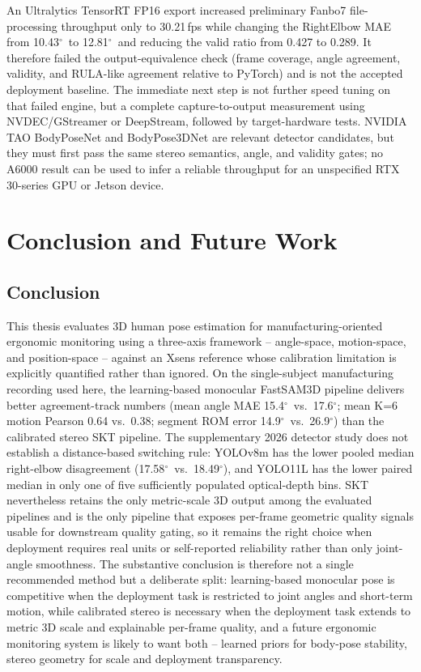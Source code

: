 \documentclass[12pt,a4paper]{article}
\newcommand{\degr}{\ensuremath{^\circ}}
\begin{document}
An Ultralytics TensorRT FP16 export increased preliminary Fanbo7 file-processing throughput only
to 30.21\,fps while changing the RightElbow MAE from 10.43\degr\ to
12.81\degr\ and reducing the valid ratio from 0.427 to 0.289.  It therefore
failed the output-equivalence check (frame coverage, angle agreement,
validity, and RULA-like agreement relative to PyTorch) and is not the accepted deployment
baseline.  The immediate next step is not further speed tuning on that
failed engine, but a complete capture-to-output measurement using
NVDEC/GStreamer or DeepStream, followed by target-hardware tests.  NVIDIA
TAO BodyPoseNet and BodyPose3DNet are relevant detector candidates, but they
must first pass the same stereo semantics, angle, and validity gates; no
A6000 result can be used to infer a reliable throughput for an unspecified
RTX 30-series GPU or Jetson device.

\clearpage
\section{Conclusion and Future Work}
\label{sec:conclusion}

\subsection{Conclusion}

This thesis evaluates 3D human pose estimation for manufacturing-oriented
ergonomic monitoring using a three-axis framework -- angle-space,
motion-space, and position-space -- against an Xsens reference whose
calibration limitation is explicitly quantified rather than ignored.
On the single-subject manufacturing recording used here, the
learning-based monocular FastSAM3D pipeline delivers better
agreement-track numbers (mean angle MAE 15.4\degr\ vs.\ 17.6\degr; mean
K=6 motion Pearson 0.64 vs.\ 0.38; segment ROM error 14.9\degr\ vs.\
26.9\degr) than the calibrated stereo SKT pipeline.
The supplementary 2026 detector study does not establish a distance-based
switching rule: YOLOv8m has the lower pooled median right-elbow disagreement
(17.58\degr\ vs.\ 18.49\degr), and YOLO11L has the lower paired median in
only one of five sufficiently populated optical-depth bins.
SKT nevertheless retains the only metric-scale 3D output among the
evaluated pipelines and is the only pipeline that exposes per-frame
geometric quality signals usable for downstream quality gating, so it
remains the right choice when deployment requires real units or
self-reported reliability rather than only joint-angle smoothness.
The substantive conclusion is therefore not a single recommended method
but a deliberate split: learning-based monocular pose is competitive
when the deployment task is restricted to joint angles and short-term
motion, while calibrated stereo is necessary when the deployment task
extends to metric 3D scale and explainable per-frame quality, and a
future ergonomic monitoring system is likely to want both -- learned
priors for body-pose stability, stereo geometry for scale and
deployment transparency.
\end{document}
